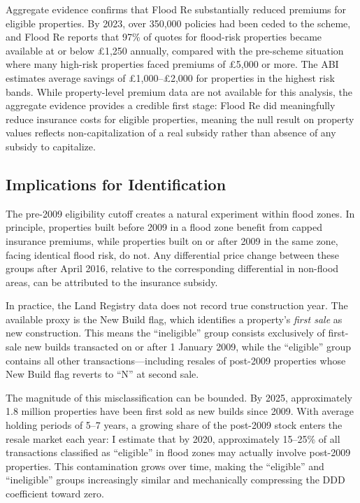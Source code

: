 \documentclass[12pt]{article}
\begin{document}
Aggregate evidence confirms that Flood Re substantially reduced premiums for eligible properties. By 2023, over 350,000 policies had been ceded to the scheme, and Flood Re reports that 97\% of quotes for flood-risk properties became available at or below \pounds1,250 annually, compared with the pre-scheme situation where many high-risk properties faced premiums of \pounds5,000 or more. The ABI estimates average savings of \pounds1,000--\pounds2,000 for properties in the highest risk bands. While property-level premium data are not available for this analysis, the aggregate evidence provides a credible first stage: Flood Re did meaningfully reduce insurance costs for eligible properties, meaning the null result on property values reflects non-capitalization of a real subsidy rather than absence of any subsidy to capitalize.

\subsection{Implications for Identification}

The pre-2009 eligibility cutoff creates a natural experiment within flood zones. In principle, properties built before 2009 in a flood zone benefit from capped insurance premiums, while properties built on or after 2009 in the same zone, facing identical flood risk, do not. Any differential price change between these groups after April 2016, relative to the corresponding differential in non-flood areas, can be attributed to the insurance subsidy.

In practice, the Land Registry data does not record true construction year. The available proxy is the New Build flag, which identifies a property's \textit{first sale} as new construction. This means the ``ineligible'' group consists exclusively of first-sale new builds transacted on or after 1 January 2009, while the ``eligible'' group contains all other transactions---including resales of post-2009 properties whose New Build flag reverts to ``N'' at second sale.

The magnitude of this misclassification can be bounded. By 2025, approximately 1.8 million properties have been first sold as new builds since 2009. With average holding periods of 5--7 years, a growing share of the post-2009 stock enters the resale market each year: I estimate that by 2020, approximately 15--25\% of all transactions classified as ``eligible'' in flood zones may actually involve post-2009 properties. This contamination grows over time, making the ``eligible'' and ``ineligible'' groups increasingly similar and mechanically compressing the DDD coefficient toward zero.
\end{document}
